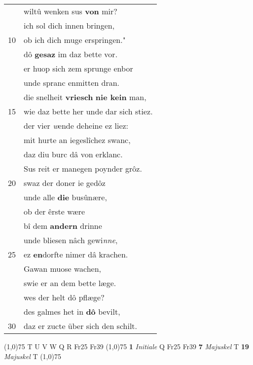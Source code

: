 \documentclass[8pt,a4paper,notitlepage]{article}
\begin{document}
\begin{table}[ht]
\begin{minipage}[t]{0.5\linewidth}
\begin{tabular}{rl}
 & wiltû wenken sus \textbf{von} mir?\\ 
 & ich sol dich innen bringen,\\ 
10 & ob ich dich muge erspringen."\\ 
 & dô \textbf{gesaz} im daz bette vor.\\ 
 & er huop sich zem sprunge enbor\\ 
 & unde spranc enmitten dran.\\ 
 & die snelheit \textbf{vriesch} \textbf{nie kein} man,\\ 
15 & wie daz bette her unde dar sich stiez.\\ 
 & der vier \textit{w}ende deheine ez liez:\\ 
 & mit hurte an iegeslîchez swanc,\\ 
 & daz diu burc dâ von erklanc.\\ 
 & Sus reit er manegen poynder grôz.\\ 
20 & swaz der doner ie gedôz\\ 
 & unde alle \textbf{die} busûnære,\\ 
 & ob der êrste wære\\ 
 & bî dem \textbf{andern} drinne\\ 
 & unde bliesen nâch gewi\textit{nne},\\ 
25 & ez \textbf{en}dorfte nimer dâ krachen.\\ 
 & Gawan muose wachen,\\ 
 & swie er an dem bette læge.\\ 
 & wes der helt dô pflæge?\\ 
 & des galmes het in \textbf{dô} bevilt,\\ 
30 & daz er zucte über sich den schilt.\\ 
\end{tabular}
\scriptsize
\line(1,0){75} \newline
T U V W Q R Fr25 Fr39 \newline
\line(1,0){75} \newline
\textbf{1} \textit{Initiale} Q Fr25 Fr39  \textbf{7} \textit{Majuskel} T  \textbf{19} \textit{Majuskel} T  \newline
\line(1,0){75} \newline

\end{minipage}
\end{table}
\end{document}
